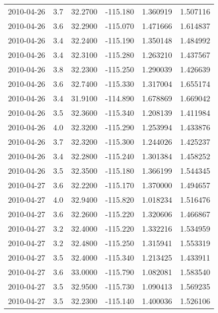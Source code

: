 \begin{tabular}{lrrrrr}
2010-04-26 &       3.7 &  32.2700 &  -115.180 &         1.360919 &         1.507116 \\
2010-04-26 &       3.6 &  32.2900 &  -115.070 &         1.471666 &         1.614837 \\
2010-04-26 &       3.4 &  32.2400 &  -115.190 &         1.350148 &         1.484992 \\
2010-04-26 &       3.4 &  32.3100 &  -115.280 &         1.263210 &         1.437567 \\
2010-04-26 &       3.8 &  32.2300 &  -115.250 &         1.290039 &         1.426639 \\
2010-04-26 &       3.6 &  32.7400 &  -115.330 &         1.317004 &         1.655174 \\
2010-04-26 &       3.4 &  31.9100 &  -114.890 &         1.678869 &         1.669042 \\
2010-04-26 &       3.5 &  32.3600 &  -115.340 &         1.208139 &         1.411984 \\
2010-04-26 &       4.0 &  32.3200 &  -115.290 &         1.253994 &         1.433876 \\
2010-04-26 &       3.7 &  32.3200 &  -115.300 &         1.244026 &         1.425237 \\
2010-04-26 &       3.4 &  32.2800 &  -115.240 &         1.301384 &         1.458252 \\
2010-04-26 &       3.5 &  32.3500 &  -115.180 &         1.366199 &         1.544345 \\
2010-04-27 &       3.6 &  32.2200 &  -115.170 &         1.370000 &         1.494657 \\
2010-04-27 &       4.0 &  32.9400 &  -115.820 &         1.018234 &         1.516476 \\
2010-04-27 &       3.6 &  32.2600 &  -115.220 &         1.320606 &         1.466867 \\
2010-04-27 &       3.2 &  32.4000 &  -115.220 &         1.332216 &         1.534959 \\
2010-04-27 &       3.2 &  32.4800 &  -115.250 &         1.315941 &         1.553319 \\
2010-04-27 &       3.5 &  32.4000 &  -115.340 &         1.213425 &         1.433911 \\
2010-04-27 &       3.6 &  33.0000 &  -115.790 &         1.082081 &         1.583540 \\
2010-04-27 &       3.5 &  32.9500 &  -115.730 &         1.090413 &         1.569235 \\
2010-04-27 &       3.5 &  32.2300 &  -115.140 &         1.400036 &         1.526106 \\

\end{tabular}
